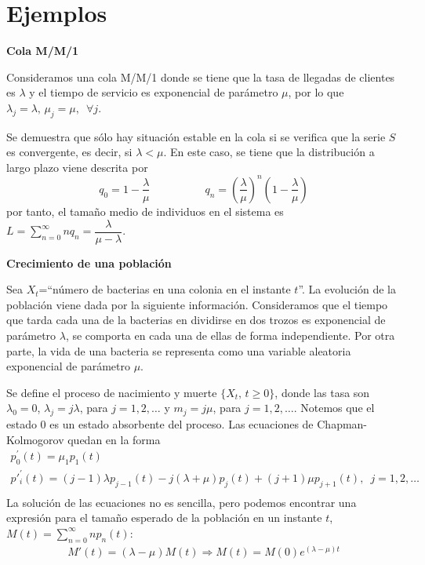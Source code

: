 \section{Ejemplos}
{\bf Cola M/M/1}
\par
Consideramos una cola M/M/1 donde se tiene que la tasa de
llegadas de clientes es $\lambda$ y el tiempo de servicio es
exponencial de par\'{a}metro $\mu$, por lo que
$\lambda_j=\lambda,\,\mu_j=\mu,\enspace \forall j$.
\par
Se demuestra que s\'{o}lo hay situaci\'{o}n estable en la cola si se
verifica que la serie $S$ es convergente, es decir, si
$\lambda<\mu$. En este caso, se tiene que la distribuci\'{o}n a largo
plazo viene descrita por
\[
q_0=1-\frac{\lambda}{\mu}\hspace{60pt}
q_n=\left(\frac{\lambda}{\mu}\right)^n
\left(1-\frac{\lambda}{\mu}\right)
\]
por tanto, el tama\~{n}o medio de individuos en el sistema es
$L=\displaystyle\sum_{n=0}^\infty n
q_n=\dfrac{\lambda}{\mu-\lambda}$.
\par
{\bf Crecimiento de una poblaci\'{o}n}
\par
Sea $X_t$=``n\'{u}mero de bacterias en una colonia en el instante
$t$''. La evoluci\'{o}n de la poblaci\'{o}n viene dada por la siguiente
informaci\'{o}n. Consideramos que el tiempo que tarda cada una de la
bacterias en dividirse en dos trozos es exponencial de par\'{a}metro
$\lambda$, se comporta en cada una de ellas de forma
independiente. Por otra parte, la vida de una bacteria se
representa como una variable aleatoria exponencial de par\'{a}metro
$\mu$.
\par
Se define el proceso de nacimiento y muerte $\{X_t,\,t\geq 0\}$,
donde las tasa son $\lambda_0=0$, $\lambda_j=j\lambda$, para
$j=1,2,\ldots$ y $m_j=j\mu$, para $j=1,2,\ldots$. Notemos que el
estado 0 es un estado absorbente del proceso. Las ecuaciones de
Chapman-Kolmogorov quedan en la forma
\[
\begin{array}{l}
 p^\prime_{0}(t)=\mu_1 p_{1}(t)\\[10pt]
%
p'^\prime_{i}(t)=(j-1)\lambda p_{j-1}(t)-j(\lambda +\mu)
p_j(t)+(j+1)\mu p_{j+1}(t),\enspace j=1,2,\ldots\\
\end{array}
\]
La soluci\'{o}n de las ecuaciones no es sencilla, pero podemos
encontrar una expresi\'{o}n para el tama\~{n}o esperado de la poblaci\'{o}n
en un instante $t$, $M(t)=\displaystyle\sum_{n=0}^\infty n
p_n(t)$:
\[
\begin{array}{l}
M'(t) =(\lambda-\mu) M(t)\Rightarrow M(t) =M(0) e^{(\lambda-\mu)t}
\end{array}
\]
